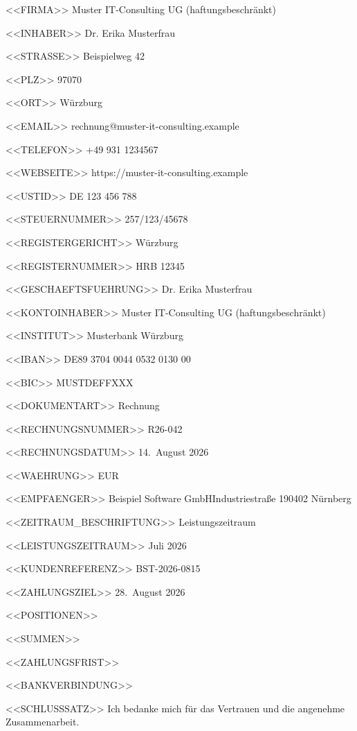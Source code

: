<<FIRMA>>
Muster IT-Consulting UG (haftungsbeschränkt)

<<INHABER>>
Dr. Erika Musterfrau

<<STRASSE>>
Beispielweg 42

<<PLZ>>
97070

<<ORT>>
Würzburg

<<EMAIL>>
rechnung@muster-it-consulting.example

<<TELEFON>>
+49 931 1234567

<<WEBSEITE>>
https://muster-it-consulting.example

<<USTID>>
DE 123 456 788

<<STEUERNUMMER>>
257/123/45678

<<REGISTERGERICHT>>
Würzburg

<<REGISTERNUMMER>>
HRB 12345

<<GESCHAEFTSFUEHRUNG>>
Dr. Erika Musterfrau

<<KONTOINHABER>>
Muster IT-Consulting UG (haftungsbeschränkt)

<<INSTITUT>>
Musterbank Würzburg

<<IBAN>>
DE89 3704 0044 0532 0130 00

<<BIC>>
MUSTDEFFXXX

<<DOKUMENTART>>
Rechnung

<<RECHNUNGSNUMMER>>
R26-042

<<RECHNUNGSDATUM>>
14.~August 2026

<<WAEHRUNG>>
EUR

<<EMPFAENGER>>
Beispiel Software GmbH\zeilenwechsel{}Industriestraße 1\zeilenwechsel{}90402 Nürnberg

<<ZEITRAUM_BESCHRIFTUNG>>
Leistungszeitraum

<<LEISTUNGSZEITRAUM>>
Juli 2026

<<KUNDENREFERENZ>>
BST-2026-0815

<<ZAHLUNGSZIEL>>
28.~August 2026

<<POSITIONEN>>
 \positionstrenner{}

<<SUMMEN>>
   \summentrenner{}

<<ZAHLUNGSFRIST>>

<<BANKVERBINDUNG>>
\bankblock{}

<<SCHLUSSSATZ>>
Ich bedanke mich für das Vertrauen und die angenehme Zusammenarbeit.
